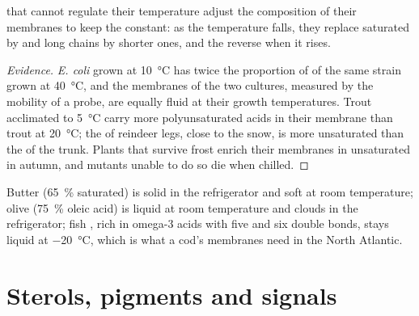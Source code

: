 \begin{proposition}\label{prop:b1:lipids:homeoviscous}
 that cannot regulate their temperature adjust the composition
of their membranes to keep the  constant: as the temperature
falls, they replace saturated by  and long
chains by shorter ones, and the reverse when it rises.
\end{proposition}
\begin{proof}[Evidence]
\emph{E. coli} grown at \qty{10}{\celsius} has twice the proportion of
 of the same strain grown at \qty{40}{\celsius},
and the membranes of the two cultures, measured by the mobility of a
probe, are equally fluid at their growth temperatures. Trout
acclimated to \qty{5}{\celsius} carry more polyunsaturated acids in
their membrane  than trout at \qty{20}{\celsius}; the  of
reindeer legs, close to the snow, is more unsaturated than the  of
the trunk. Plants that survive frost enrich their membranes in
unsaturated  in autumn, and mutants unable to do so die when
chilled.
\end{proof}

\begin{example}\label{ex:b1:lipids:kitchen}
Butter (\qty{65}{\%} saturated) is solid in the refrigerator and soft
at room temperature; olive  (\qty{75}{\%} oleic acid) is liquid at
room temperature and clouds in the refrigerator; fish , rich in
omega-3 acids with five and six double bonds, stays liquid at
\qty{-20}{\celsius}, which is what a cod's membranes need in the North
Atlantic.
\end{example}

\section{Sterols, pigments and signals}

